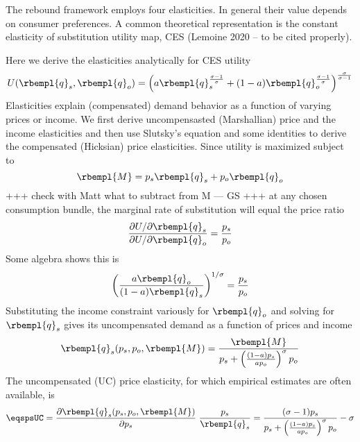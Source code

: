 


The rebound framework employs four elasticities.
In general their value depends on consumer preferences.
A common theoretical representation is the constant elasticity
of substitution utility map, CES (Lemoine 2020 -- to be cited properly).

Here we derive the elasticities analytically for CES utility
\begin{equation}
U(\rbempl{q}_s,\rbempl{q}_o) = 
\left( a \rbempl{q}_s^{\frac{\sigma-1}{\sigma}} + (1-a) \rbempl{q}_o^{\frac{\sigma-1}{\sigma}}\right) ^{\frac{\sigma}{\sigma-1}}
\end{equation}
Elasticities explain (compensated) demand behavior as a function of varying prices or income.
We first derive uncompensasted (Marshallian) price and the income elasticities
and then use Slutsky's equation and some identities to derive the
compensated (Hicksian) price elasticities.
Since utility is maximized subject to 
\begin{equation}
\rbempl{M} = p_s \rbempl{q}_s + p_o\rbempl{q}_o 
\end{equation}
+++ check with Matt what to subtract from M --- GS +++
at any chosen consumption bundle, the marginal rate of substitution will
equal the price ratio
\begin{equation}
 \frac {\partial U / \partial \rbempl{q}_s}{\partial U / \partial \rbempl{q}_o} =
 \frac{ p_s }{ p_o}
\end{equation}
Some algebra shows this is  
\begin{equation}
 \left( \frac {a \rbempl{q}_o}{(1-a) \rbempl{q}_s} \right ) ^ {1/\sigma} =
 \frac{ p_s }{ p_o}
\end{equation}
Substituting the income constraint variously for $\rbempl{q}_o$ and solving
for $ \rbempl{q}_s$ gives its uncompensated demand as a function of 
prices and income
\begin{equation}
 \rbempl{q}_s(p_s, p_o, \rbempl{M}) = \frac{ \rbempl{M}}{ p_s +
 \left (\frac{(1-a)p_s}{a p_o}\right)^\sigma p_o }
\end{equation}
The uncompensated (UC) price elasticity, for which empirical estimates are
often available, is
\begin{equation}
  \eqspsUC = \frac {\partial \rbempl{q}_s(p_s, p_o, \rbempl{M})}{\partial p_s} \; 
  \frac{p_s}{\rbempl{q}_s} = \frac{(\sigma - 1)p_s}{p_s +
  \left (\frac{(1-a)p_s}{a p_o}\right)^\sigma p_o} - \sigma 
\end{equation}

